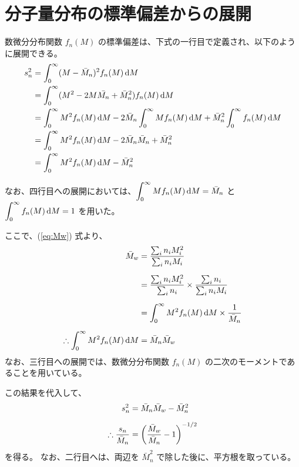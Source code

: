 \documentclass[a4paper,11pt]{jlreq}
\begin{document}
\section{分子量分布の標準偏差からの展開}
\label{sec:MwMn}

数微分分布関数 $f_n(M)$ の標準偏差は、下式の一行目で定義され、以下のように展開できる。
\begin{align}
s_n^2
	&= \displaystyle \int_0^{\infty}(M - \bar{M}_n)^2 f_n(M) \odif{M} \notag \\
	&= \displaystyle \int_0^{\infty}(M^2 - 2M \bar{M_n} + \bar{M}_n^2) f_n(M) \odif{M} \notag \\
	&= \displaystyle \int_0^{\infty} M^2 f_n(M) \odif{M} - 2 \bar{M}_n \displaystyle \int_0^{\infty} M f_n(M) \odif{M} + \bar{M}_n^2 \displaystyle \int_0^{\infty} f_n(M) \odif{M} \notag \\
	&= \displaystyle \int_0^{\infty} M^2 f_n(M) \odif{M} - 2 \bar{M}_n \bar{M}_n + \bar{M}_n^2  \notag \\
	&= \displaystyle \int_0^{\infty} M^2 f_n(M) \odif{M} - \bar{M}_n^2
\end{align}

なお、四行目への展開においては、$\displaystyle \int_0^{\infty} M f_n(M) \odif{M} = \bar{M}_n$ と $\displaystyle \int_0^{\infty} f_n(M) \odif{M} = 1$ を用いた。

ここで、(\ref{eq:Mw}) 式より、
\begin{align}
{\bar M}_w 
	&= \dfrac{\sum_i n_i M_i^2}{\sum_i n_i M_i}\notag \\[6pt]
	&= \dfrac{\sum_i n_i M_i^2}{\sum_i n_i} \times \dfrac{\sum_i n_i}{\sum_i n_i M_i}\notag \\[6pt]
	&= \displaystyle \int_0^{\infty} M^2 f_n(M) \odif{M} \times \dfrac{1}{\bar{M}_n }\notag \\[6pt]
\therefore \displaystyle \int_0^{\infty} M^2 f_n(M) \odif{M} &= \bar{M}_n \bar{M}_w
\end{align}
なお、三行目への展開では、数微分分布関数 $f_n(M)$ の二次のモーメントであることを用いている。

この結果を代入して、
\begin{align}
s_n^2 &= \bar{M}_n \bar{M}_w - \bar{M}_n^2\notag \\[6pt]
\therefore \dfrac{s_n}{\bar{M}_n} &= \left(\dfrac{\bar{M}_w}{ \bar{M}_n} - 1 \right)^{-1/2}
\end{align}
を得る。
なお、二行目へは、両辺を $\bar{M}_n^2$ で除した後に、平方根を取っている。
\end{document}
